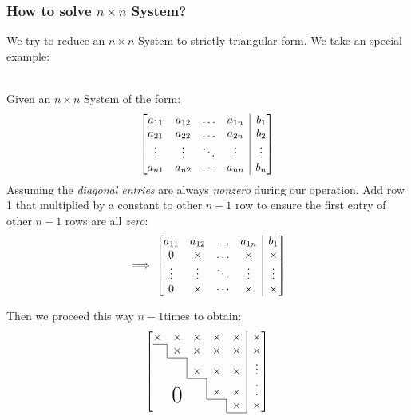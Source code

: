 \subsubsection{How to solve $n \times n$ System?}
We try to reduce an $n \times n$ System to strictly triangular form. We take an special example:
\begin{example} \qquad
\\
Given an $n \times n$ System of the form:
\begin{equation}\left[
\begin{array}{@{}cccc|c@{}}
a_{11} & a_{12} & \dots & a_{1n} &  b_1 \\
a_{21} & a_{22} & \dots & a_{2n} &  b_2 \\
\vdots    & \vdots    & \ddots & \vdots    & \vdots \\
a_{n1} & a_{n2} & \cdots & a_{nn} &   b_n
\end{array}\right]\label{eq:n*n_matrix}\end{equation}
Assuming the \emph{diagonal entries} are always \textit{nonzero} during our operation. 
Add row 1 that multiplied by a constant to other $n-1$ row to ensure the first entry of other $n-1$ rows are all \textit{zero}:
\begin{equation}
\implies 
\left[
\begin{array}{@{}cccc|c@{}}
a_{11} & a_{12} & \dots & a_{1n} &  b_1 \\
0 & \x & \dots & \x &  \x \\
\vdots    & \vdots    & \ddots & \vdots    & \vdots \\
0 & \x & \cdots & \x &   \x
\end{array}
\right] \label{eq:n*n_matrix_version1}\end{equation}


Then we proceed this way $n-1$times to obtain:
\begin{equation}
  \left[
    \begin{array}{@{}ccccc|c@{}}
    \x    & \x       & \x    & \x    & \x & \x\\ \cline{1-1}
    \bord & \x       & \x    & \x    & \x & \x\\ \cline{2-2}
          & \bord    & \x    & \x    & \x & \vdots \\ \cline{3-3}
          & \bigzero & \bord & \x    & \x & \vdots \\ \cline{4-4}
          &          &       & \bord & \x & \x \\ \cline{5-5}
  \end{array}\right]\label{eq:n*n_matrix_version2}
\end{equation}


\end{example}
